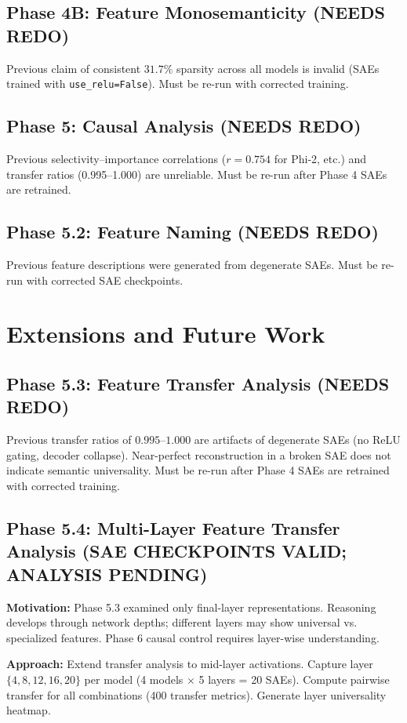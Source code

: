 \documentclass{article}
\begin{document}
\subsection{Phase 4B: Feature Monosemanticity (NEEDS REDO)}
Previous claim of consistent $31.7\%$ sparsity across all models is invalid (SAEs trained with \texttt{use\_relu=False}). Must be re-run with corrected training.

\subsection{Phase 5: Causal Analysis (NEEDS REDO)}
Previous selectivity--importance correlations ($r=0.754$ for Phi-2, etc.) and transfer ratios (0.995--1.000) are unreliable. Must be re-run after Phase 4 SAEs are retrained.

\subsection{Phase 5.2: Feature Naming (NEEDS REDO)}
Previous feature descriptions were generated from degenerate SAEs. Must be re-run with corrected SAE checkpoints.

\section{Extensions and Future Work}
\subsection{Phase 5.3: Feature Transfer Analysis (NEEDS REDO)}
Previous transfer ratios of $0.995$--$1.000$ are artifacts of degenerate SAEs (no ReLU gating, decoder collapse). Near-perfect reconstruction in a broken SAE does not indicate semantic universality. Must be re-run after Phase 4 SAEs are retrained with corrected training.

\subsection{Phase 5.4: Multi-Layer Feature Transfer Analysis (SAE CHECKPOINTS VALID; ANALYSIS PENDING)}
\textbf{Motivation:} Phase 5.3 examined only final-layer representations. Reasoning develops through network depths; different layers may show universal vs. specialized features. Phase 6 causal control requires layer-wise understanding.

\textbf{Approach:} Extend transfer analysis to mid-layer activations. Capture layer $\{4, 8, 12, 16, 20\}$ per model (4 models $\times$ 5 layers = 20 SAEs). Compute pairwise transfer for all combinations (400 transfer metrics). Generate layer universality heatmap.
\end{document}
